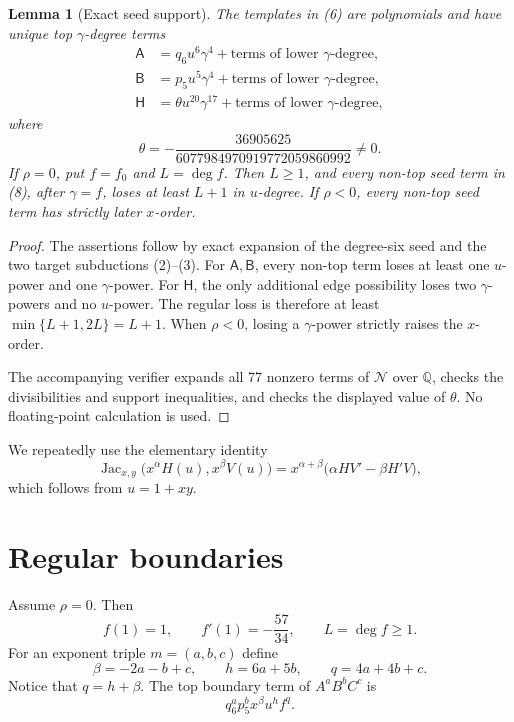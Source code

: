 \documentclass[11pt]{article}
\newtheorem{lemma}[theorem]{Lemma}
\theoremstyle{remark}
\newcommand{\Jac}{\operatorname{Jac}}
\begin{document}
\begin{lemma}[Exact seed support]
\label{lem:seed}
The templates in (6) are polynomials and have unique top
\(\gamma\)-degree terms
\[
\begin{aligned}
\mathsf A&=q_6u^6\gamma^4+\text{terms of lower \(\gamma\)-degree},\\
\mathsf B&=p_5u^5\gamma^4+\text{terms of lower \(\gamma\)-degree},\\
\mathsf H&=\theta u^{20}\gamma^{17}
  +\text{terms of lower \(\gamma\)-degree},
\end{aligned}
\tag{8}
\]
where
\[
\theta=
-\frac{36905625}{6077984970919772059860992}\ne0.
\]
If \(\rho=0\), put \(f=f_0\) and \(L=\deg f\).  Then \(L\ge1\),
and every non-top seed term in (8), after \(\gamma=f\), loses at
least \(L+1\) in \(u\)-degree.  If \(\rho<0\), every non-top seed
term has strictly later \(x\)-order.
\end{lemma}

\begin{proof}
The assertions follow by exact expansion of the degree-six seed and
the two target subductions (2)--(3).  For \(\mathsf A,\mathsf B\),
every non-top term loses at least one \(u\)-power and one
\(\gamma\)-power.  For \(\mathsf H\), the only additional edge
possibility loses two \(\gamma\)-powers and no \(u\)-power.  The
regular loss is therefore at least
\(\min\{L+1,2L\}=L+1\).  When \(\rho<0\), losing a
\(\gamma\)-power strictly raises the \(x\)-order.

The accompanying verifier expands all 77 nonzero terms of
\(\mathcal N\) over \(\mathbb Q\), checks the divisibilities and
support inequalities, and checks the displayed value of \(\theta\).
No floating-point calculation is used.
\end{proof}

We repeatedly use the elementary identity
\[
\Jac_{x,y}\bigl(x^\alpha H(u),x^\beta V(u)\bigr)
=x^{\alpha+\beta}
\bigl(\alpha HV'-\beta H'V\bigr),
\tag{9}
\]
which follows from \(u=1+xy\).

\section{Regular boundaries}

Assume \(\rho=0\).  Then
\[
f(1)=1,\qquad f'(1)=-\frac{57}{34},\qquad L=\deg f\ge1.
\tag{10}
\]
For an exponent triple \(m=(a,b,c)\) define
\[
\beta=-2a-b+c,\qquad h=6a+5b,\qquad q=4a+4b+c.
\tag{11}
\]
Notice that \(q=h+\beta\).  The top boundary term of
\(A^aB^bC^c\) is
\[
q_6^ap_5^b x^\beta u^hf^q.
\tag{12}
\]
\end{document}
